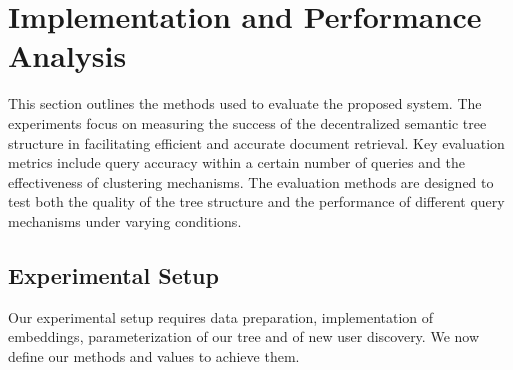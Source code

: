 \documentclass[10pt,journal]{IEEEtran}
\begin{document}
\section{Implementation and Performance Analysis}
\label{sec:impperformance}

This section outlines the methods used to evaluate the proposed system. The experiments focus on measuring the success of the decentralized semantic tree structure in facilitating efficient and accurate document retrieval. Key evaluation metrics include query accuracy within a certain number of queries and the effectiveness of clustering mechanisms. The evaluation methods are designed to test both the quality of the tree structure and the performance of different query mechanisms under varying conditions.

\subsection{Experimental Setup}
Our experimental setup requires data preparation, implementation of embeddings, parameterization of our tree and of new user discovery.
We now define our methods and values to achieve them.
\end{document}
